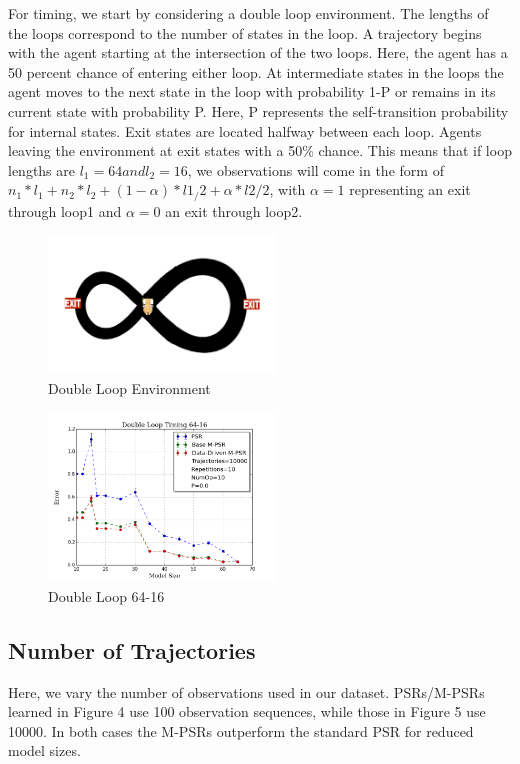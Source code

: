 For timing, we start by considering a double loop environment. The lengths of the loops correspond to the number of states in the loop. A trajectory begins with the agent starting at the intersection of the two loops. Here, the agent has a 50 percent chance of entering either loop. At intermediate states in the loops the agent moves to the next state in the loop with probability 1-P or remains in its current state with probability P. Here, P represents the self-transition probability for internal states. Exit states are located halfway between each loop. Agents leaving the environment at exit states with a 50\% chance. This means that if loop lengths are $l_1=64 and l_2=16$, we observations will come in the form of $n_1*l_1+n_2*l_2+(1-\alpha)*l1_/2 + \alpha*l2/2$, with $\alpha=1$ representing an exit through loop1 and $\alpha=0$ an exit through loop2.

\begin{figure}[ht!]
\centering
\includegraphics[width=60mm]{uCOREPICS/DL/doubleLoopImage.png}
\caption{Double Loop Environment\label{overflow}}
\end{figure}

\begin{figure}[ht!]
\centering
\includegraphics[width=60mm]{uCOREPICS/DL/64-16-10000.png}
\caption{Double Loop 64-16\label{overflow}}
\end{figure}

\subsection{Number of Trajectories}

Here, we vary the number of observations used in our dataset. PSRs/M-PSRs learned in Figure 4 use 100 observation sequences, while those in Figure 5 use 10000. In both cases the M-PSRs outperform the standard PSR for reduced model sizes.

